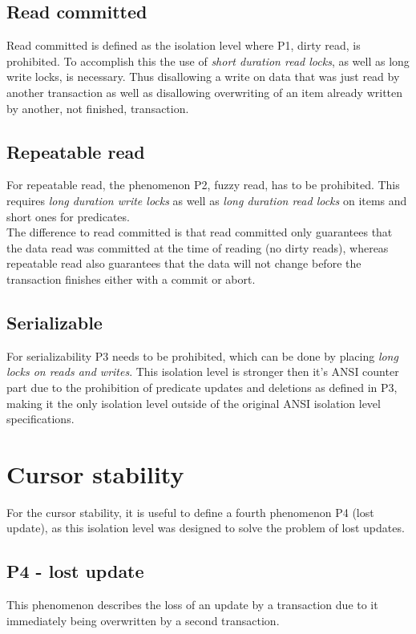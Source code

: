\documentclass[sigconf, review=true]{acmart}
\begin{document}
\subsection{Read committed}
Read committed is defined as the isolation level where P1, dirty read, is prohibited.
To accomplish this the use of \emph{short duration read locks}, as well as long write locks, is
necessary. Thus disallowing a write on data that was just read by another transaction as
well as disallowing overwriting of an item already written by another, not finished, transaction.

\subsection{Repeatable read}
For repeatable read, the phenomenon P2, fuzzy read, has to be prohibited.
This requires \emph{long duration write locks} as well as \emph{long duration read locks} on
items and short ones for predicates.\\
The difference to read committed is that read committed only guarantees that
the data read was committed at the time of reading (no dirty reads), whereas
repeatable read also guarantees that the data will not change before the
transaction finishes either with a commit or abort.


\subsection{Serializable}
For serializability P3 needs to be prohibited, which can be done by placing \emph{long locks
on reads and writes}. This isolation level is stronger then it's ANSI counter part due to the
prohibition of predicate updates and deletions as defined in P3, making it the only isolation level
outside of the original ANSI isolation level specifications.

\section{Cursor stability}
For the cursor stability, it is useful to define a fourth phenomenon P4 (lost update), as this isolation level
was designed to solve the problem of lost updates.
\subsection{ P4 - lost update}
This phenomenon describes the loss of an update by a transaction due to it immediately being overwritten
by a second transaction.
\end{document}
